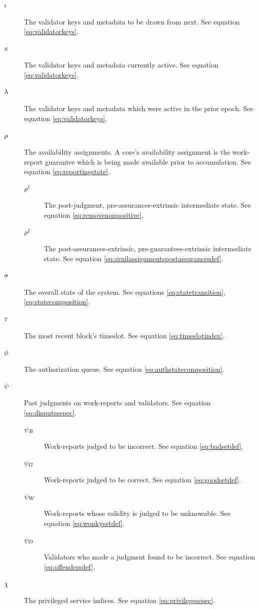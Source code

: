\begin{description}
  \item[$\iota$] The validator keys and metadata to be drawn from next. See equation \ref{eq:validatorkeys}.
  \item[$\kappa$] The validator keys and metadata currently active. See equation \ref{eq:validatorkeys}.
  \item[$\lambda$] The validator keys and metadata which were active in the prior epoch. See equation \ref{eq:validatorkeys}.
  \item[$\rho$] The availability assignments. A core's availability assignment is the work-report guarantee which is being made available prior to accumulation. See equation \ref{eq:reportingstate}.
  \begin{description}
    \item[$\rho^\dagger$] The post-judgment, pre-assurances-extrinsic intermediate state. See equation \ref{eq:removenonpositive}.
    \item[$\rho^\ddagger$] The post-assurances-extrinsic, pre-guarantees-extrinsic intermediate state. See equation \ref{eq:availassignmentspostassurancesdef}.
  \end{description}
  \item[$\sigma$] The overall state of the system. See equations \ref{eq:statetransition}, \ref{eq:statecomposition}.
  \item[$\tau$] The most recent block's timeslot. See equation \ref{eq:timeslotindex}.
  \item[$\phi$] The authorization queue. See equation \ref{eq:authstatecomposition}.
  \item[$\psi$] Past judgments on work-reports and validators. See equation \ref{eq:disputesspec}.
  \begin{description}
    \item[$\psi_B$] Work-reports judged to be incorrect. See equation \ref{eq:badsetdef}.
    \item[$\psi_G$] Work-reports judged to be correct. See equation \ref{eq:goodsetdef}.
    \item[$\psi_W$] Work-reports whose validity is judged to be unknowable. See equation \ref{eq:wonkysetdef}.
    \item[$\psi_O$] Validators who made a judgment found to be incorrect. See equation \ref{eq:offendersdef}.
  \end{description}
  \item[$\chi$] The privileged service indices. See equation \ref{eq:privilegesspec}.

\end{description}
